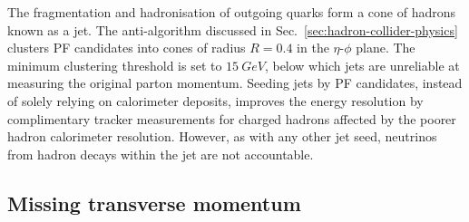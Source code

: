 The fragmentation and hadronisation of outgoing quarks form a cone of hadrons known as a jet. The anti-\kt algorithm \cite{Cacciari:2008gp,Cacciari2012} discussed in Sec.~\ref{sec:hadron-collider-physics} clusters PF candidates into cones of radius $R=0.4$ in the $\eta$-$\phi$ plane.  The minimum clustering threshold is set to $\SI{15}{GeV}$, below which jets are unreliable at measuring the original parton momentum. Seeding jets by PF candidates, instead of solely relying on calorimeter deposits, improves the energy resolution by complimentary tracker measurements for charged hadrons affected by the poorer hadron calorimeter resolution. However, as with any other jet seed, neutrinos from hadron decays within  the jet are not accountable.


\subsection{Missing transverse momentum}

